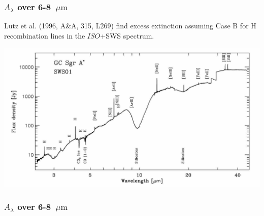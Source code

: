 \begin{frame}\frametitle{$A_\lambda$ over 6-8~$\mu\mathrm{m}$ }


Lutz et al. (1996, A\&A, 315, L269) find excess extinction assuming
Case B for H recombination lines in the $ISO$+SWS spectrum.
\begin{center}
\includegraphics[width=\textwidth,height=!]{./D/iso_GC.jpg}
\end{center}


\end{frame}
\begin{frame}\frametitle{$A_\lambda$ over 6-8~$\mu\mathrm{m}$ }


\begin{center}
\end{center}


\end{frame}


